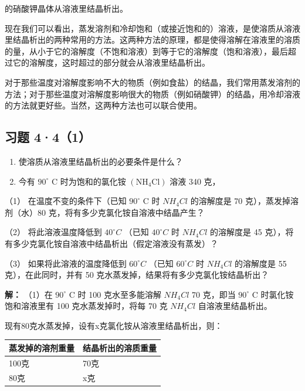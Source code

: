 的硝酸钾晶体从溶液里结晶析出。

现在我们可以看出，蒸发溶剂和冷却饱和（或接近饱和的）溶液，是使溶质从溶液里结晶析出的两种常用的方法。这两种方法的原理，都是使得溶解在溶液里的溶质的量，从小于它的溶解度（不饱和溶液）到等于它的溶解度（饱和溶液），最后超过它的溶解度，这时超过的部分就会从溶液里结晶析出。

对于那些温度对溶解度影响不大的物质（例如食盐）的结晶，我们常用蒸发溶剂的方法；对于那些温度对溶解度影响很大的物质（例如硝酸钾）的结晶，用冷却溶液的方法就更好些。当然，这两种方法也可以联合使用。

\subsection{习题 4·4（1）}

\begin{enumerate}
\item
  使溶质从溶液里结晶析出的必要条件是什么？
\item
  今有 \(90^{\circ}\) C 时为饱和的氯化铵
  \(\left(\mathrm{NH}_{4}\mathrm{Cl}\right)\) 溶液 340 克，
\end{enumerate}

（1） 在温度不变的条件下（已知 \(90^{\circ}\) C 时 \(NH_{4}Cl\)
的溶解度是 70 克），蒸发掉溶剂（水）80
克，将有多少克氯化铵自溶液中结晶产生？

（2） 将此溶液温度降低到 \(40^{\circ}C\) （已知 \(40^{\circ}C\) 时
\(NH_{4}Cl\) 的溶解度是 45
克），将有多少克氯化铵自溶液中结晶析出（假定溶液没有蒸发）？

（3） 如果将此溶液的温度降低到 \(60^{\circ}C\) （已知 \(60^{\circ}C\) 时
\(NH_{4}Cl\) 的溶解度是 55 克），在此同时，并有 50
克水蒸发掉，结果将有多少克氯化铵结晶析出？

\textbf{解：} （1）在 \(90^{\circ}\) C 时 100 克水至多能溶解
\(NH_{4}Cl\) 70 克，即当 \(90^{\circ}\) C 时氯化铵饱和溶液里有 100
克水蒸发掉时，将每 70 克 \(NH_{4}Cl\) 自溶液里结晶析出。

现有80克水蒸发掉，设有x克氯化铵从溶液里结晶析出，则：

{\def\LTcaptype{none} %
\begin{longtable}[]{@{}ll@{}}
\toprule\noalign{}
蒸发掉的溶剂重量 & 结晶析出的溶质重量 \\
\midrule\noalign{}
\endhead
\bottomrule\noalign{}
\endlastfoot
100克 & 70克 \\
80克 & x克 \\
\end{longtable}
}

